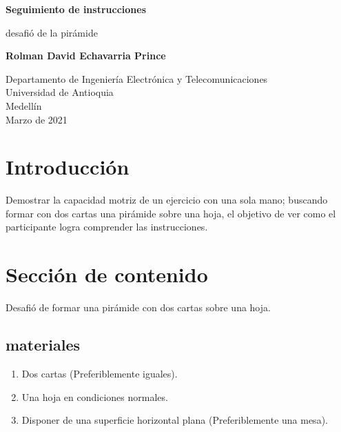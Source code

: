 \documentclass{article}
\begin{document}
\begin{titlepage}
    \begin{center}
        \vspace*{1cm}
            
        \Huge
        \textbf{Seguimiento de instrucciones}
            
        \vspace{0.5cm}
        \LARGE
        desafió de la pirámide 
            
        \vspace{1.5cm}
            
        \textbf{Rolman David Echavarria Prince}
            
        \vfill
            
        \vspace{0.8cm}
            
        \Large
        Departamento de Ingeniería Electrónica y Telecomunicaciones\\
        Universidad de Antioquia\\
        Medellín\\
        Marzo de 2021
            
    \end{center}
\end{titlepage}

\tableofcontents
\newpage
\section{Introducción}\label{intro}
Demostrar la capacidad motriz de un ejercicio con una sola mano; buscando formar con dos cartas una pirámide sobre una hoja, el objetivo de ver como el participante logra comprender las instrucciones.

\section{Sección de contenido} \label{contenido}
Desafió de formar una pirámide con dos cartas sobre una hoja.
\subsection{materiales}
\begin{enumerate}
    \item Dos cartas (Preferiblemente iguales).
    \item Una hoja en condiciones normales.
    \item Disponer de una superficie horizontal plana (Preferiblemente una mesa).
\end{enumerate}
\end{document}
